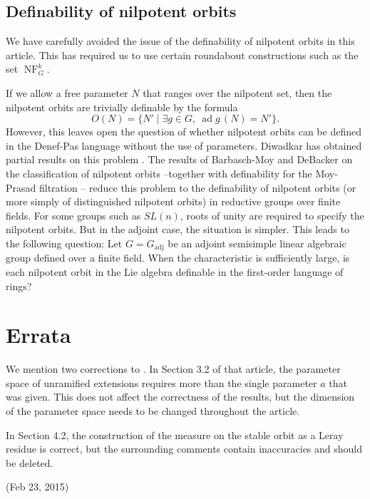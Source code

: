 \documentclass[12pt]{amsart}
\newcommand{\op}[1]{\operatorname{#1}}
\def\NF{\op{NF}}
\theoremstyle{plain}
\theoremstyle{definition}
\begin{document}
\subsection{Definability of nilpotent orbits}

We have carefully avoided the issue of the definability of nilpotent
orbits in this article.  This has required us to use certain roundabout
constructions such as the set $\NF^k_G$.

If we allow a free parameter $N$ that ranges over the nilpotent set,
then the nilpotent orbits are trivially definable by the formula
\[
O(N) = \{N' \mid \exists g\in G,~ \op{ad}g\,(N) = N' \}.
\]  
However, this leaves open the question of whether nilpotent orbits can
be defined in the Denef-Pas language without the use of parameters.
Diwadkar has obtained partial results on this problem
\cite{diwadkar2006nilpoten}.  The results of Barbasch-Moy and DeBacker
on the classification of nilpotent orbits --together with definability
for the Moy-Prasad filtration \cite{CGH} -- reduce this problem to the
definability of nilpotent orbits (or more simply of distinguished
nilpotent orbits) in reductive groups over finite fields.  For some
groups such as $SL(n)$, roots of unity are required to specify the
nilpotent orbits.  But in the adjoint case, the situation is
simpler. This leads to the following question: Let $G=G_{\text{adj}}$
be an adjoint semisimple linear algebraic group defined over a finite
field.  When the characteristic is sufficiently large, is each
nilpotent orbit in the Lie algebra definable in the first-order
language of rings?

\section{Errata}

We mention two corrections to \cite{CHL}.  In Section 3.2 of that
article, the parameter space of unramified extensions requires more
than the single parameter $a$ that was given.  This does not affect
the correctness of the results, but the dimension of the parameter
space needs to be changed throughout the article.

In Section 4.2, the construction of the measure on the stable orbit as
a Leray residue is correct, but the surrounding comments contain
inaccuracies and should be deleted.






(Feb 23, 2015)
\end{document}
